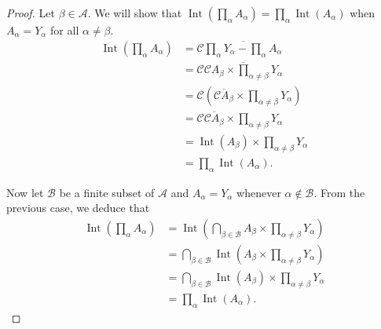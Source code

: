 \begin{proof}
	Let \( \beta \in \mathscr{A} \). We will show that \( \operatorname{Int}\left( \prod_{\alpha} A_{\alpha} \right) = \prod_{\alpha} \operatorname{Int}(A_{\alpha}) \) when \( A_{\alpha} = Y_{\alpha} \) for all \(\alpha \ne \beta\).
	\begingroup
	\allowdisplaybreaks%
	\begin{align*}
		\operatorname{Int}\left( \prod_{\alpha} A_{\alpha} \right) & = \mathscr{C}\overline{\prod_{\alpha} Y_{\alpha} - \prod_{\alpha}A_{\alpha}}                         \\
		                                                           & = \mathscr{C}\overline{\mathscr{C}A_{\beta} \times \prod_{\alpha \ne \beta} Y_{\alpha}}              \\
		                                                           & = \mathscr{C}\left( \overline{\mathscr{C}A_{\beta}} \times \prod_{\alpha\ne\beta} Y_{\alpha} \right) \\
		                                                           & = \mathscr{C}\overline{\mathscr{C}A_{\beta}} \times \prod_{\alpha\ne\beta} Y_{\alpha}                \\
		                                                           & = \operatorname{Int}(A_{\beta}) \times \prod_{\alpha\ne\beta} Y_{\alpha}                             \\
		                                                           & = \prod_{\alpha} \operatorname{Int}(A_{\alpha}).
	\end{align*}
	\endgroup

	Now let \( \mathscr{B} \) be a finite subset of \( \mathscr{A} \) and \( A_{\alpha} = Y_{\alpha} \) whenever \( \alpha \notin \mathscr{B} \). From the previous case, we deduce that
	\begingroup
	\allowdisplaybreaks%
	\begin{align*}
		\operatorname{Int}\left( \prod_{\alpha} A_{\alpha} \right) & = \operatorname{Int}\left( \bigcap_{\beta \in \mathscr{B}} A_{\beta} \times \prod_{\alpha\ne\beta} Y_{\alpha} \right) \\
		                                                           & = \bigcap_{\beta \in \mathscr{B}} \operatorname{Int}\left( A_{\beta} \times \prod_{\alpha\ne\beta} Y_{\alpha} \right) \\
		                                                           & = \bigcap_{\beta \in \mathscr{B}} \operatorname{Int}(A_{\beta}) \times \prod_{\alpha\ne\beta} Y_{\alpha}              \\
		                                                           & = \prod_{\alpha} \operatorname{Int}(A_{\alpha}).
	\end{align*}
	\endgroup
\end{proof}

